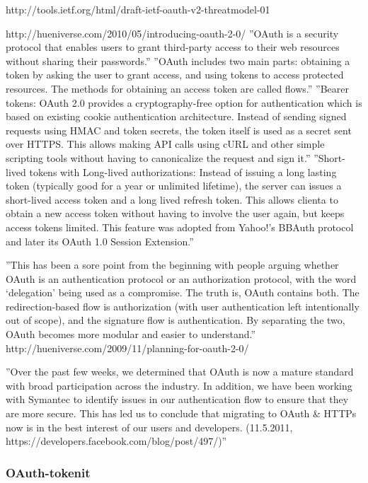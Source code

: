 \documentclass[finnish,gradu]{tktltiki}
\begin{document}
  http://tools.ietf.org/html/draft-ietf-oauth-v2-threatmodel-01

  http://hueniverse.com/2010/05/introducing-oauth-2-0/
  ''OAuth is a security protocol that enables users to grant third-party access to their web resources without sharing their passwords.''
  ''OAuth includes two main parts: obtaining a token by asking the user to grant access, and using tokens to access protected resources. The methods for obtaining an access token are called flows.''
  ''Bearer tokens: OAuth 2.0 provides a cryptography-free option for authentication which is based on existing cookie authentication architecture. Instead of sending signed requests using HMAC and token secrets, the token itself is used as a secret sent over HTTPS. This allows making API calls using cURL and other simple scripting tools without having to canonicalize the request and sign it.''
  ''Short-lived tokens with Long-lived authorizations: Instead of issuing a long lasting token (typically good for a year or unlimited lifetime), the server can issues a short-lived access token and a long lived refresh token. This allows clienta to obtain a new access token without having to involve the user again, but keeps access tokens limited. This feature was adopted from Yahoo!’s BBAuth protocol and later its OAuth 1.0 Session Extension.''

  ''This has been a sore point from the beginning with people arguing whether OAuth is an authentication protocol or an authorization protocol, with the word ‘delegation’ being used as a compromise. The truth is, OAuth contains both. The redirection-based flow is authorization (with user authentication left intentionally out of scope), and the signature flow is authentication. By separating the two, OAuth becomes more modular and easier to understand.'' http://hueniverse.com/2009/11/planning-for-oauth-2-0/

  ''Over the past few weeks, we determined that OAuth is now a mature standard with broad participation across the industry. In addition, we have been working with Symantec to identify issues in our authentication flow to ensure that they are more secure. This has led us to conclude that migrating to OAuth \& HTTPs now is in the best interest of our users and developers. (11.5.2011, https://developers.facebook.com/blog/post/497/)''


  \subsubsection{OAuth-tokenit} %
  \label{ssub:oauth_tokenit}
\end{document}
